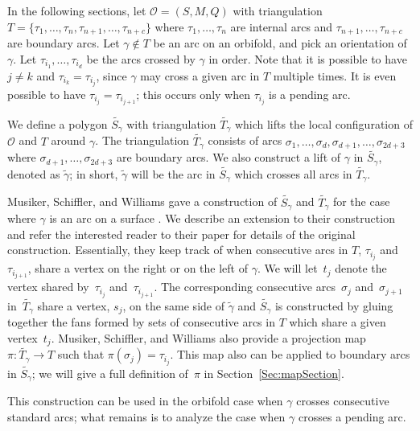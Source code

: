 \documentclass[pdftex]{sigma}%
\numberwithin{equation}{section}
\begin{document}
In the following sections, let $\mathcal{O} = (S,M,Q)$ with triangulation $T = \{ \tau_1,\ldots, \tau_n, \tau_{n+1},\ldots, \tau_{n+c}\}$ where $\tau_1,\ldots, \tau_n$ are internal arcs and $\tau_{n+1},\ldots, \tau_{n+c}$ are boundary arcs. Let $\gamma \notin T$ be an arc on an orbifold, and pick an orientation of $\gamma$. Let $\tau_{i_1},\ldots, \tau_{i_d}$ be the arcs crossed by $\gamma$ in order. Note that it is possible to have $j \neq k$ and $\tau_{i_k} = \tau_{i_j}$, since $\gamma$ may cross a given arc in $T$ multiple times. It is even possible to have $\tau_{i_j} = \tau_{i_{j+1}}$; this occurs only when $\tau_{i_j}$ is a pending arc.

We define a polygon $\widetilde{S_\gamma}$ with triangulation $\widetilde{T_\gamma}$ which lifts the local configuration of $\mathcal{O}$ and $T$ around $\gamma$. The triangulation $\widetilde{T_\gamma}$ consists of arcs $\sigma_1,\ldots, \sigma_d,\sigma_{d+1},\ldots, \sigma_{2d + 3}$ where $\sigma_{d+1},\ldots, \sigma_{2d + 3}$ are boundary arcs. We also construct a lift of $\gamma$ in $\widetilde{S_\gamma}$, denoted as $\widetilde{\gamma}$; in short, $\widetilde{\gamma}$ will be the arc in $\widetilde{S_\gamma}$ which crosses all arcs in $\widetilde{T_\gamma}$.

 Musiker, Schiffler, and Williams gave a construction of $\widetilde{S_\gamma}$ and $\widetilde{T_\gamma}$ for the case where $\gamma$ is an arc on a surface \cite{MSW}. We describe an extension to their construction and refer the interested reader to their paper for details of the original construction. Essentially, they keep track of when consecutive arcs in $T$, $\tau_{i_j}$ and $\tau_{i_{j+1}}$, share a vertex on the right or on the left of $\gamma$. We will let~$t_j$ denote the vertex shared by~$\tau_{i_j}$ and~$\tau_{i_{j+1}}$.
The corresponding consecutive arcs~$\sigma_j$ and~$\sigma_{j+1}$ in~$\widetilde{T_\gamma}$ share a vertex, $s_j$, on the same side of $\widetilde{\gamma}$ and $\widetilde{S_\gamma}$ is constructed by gluing together the fans formed by sets of consecutive arcs in $T$ which share a given vertex~$t_j$. Musiker, Schiffler, and Williams also provide a projection map $\pi\colon \widetilde{T_\gamma} \to T$ such that $\pi(\sigma_j) = \tau_{i_j}$. This map also can be applied to boundary arcs in $\widetilde{S_\gamma}$; we will give a full definition of~$\pi$ in Section~\ref{Sec:mapSection}.

This construction can be used in the orbifold case when $\gamma$ crosses consecutive standard arcs; what remains is to analyze the case when $\gamma$ crosses a pending arc.
\end{document}
